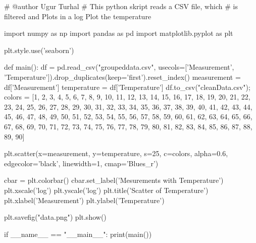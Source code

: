 \documentclass[12pt]{article}
\begin{document}
\begin{python}
# @author Ugur Turhal
# This python skript reads a CSV file, which
# is filtered and Plots in a log Plot the temperature

import numpy as np
import pandas as pd
import matplotlib.pyplot as plt

plt.style.use('seaborn')


def main():
    df = pd.read_csv("groupeddata.csv", usecols=['Measurement', 'Temperature']).drop_duplicates(keep='first').reset_index()
    measurement = df['Measurement']
    temperature = df['Temperature']
    df.to_csv("cleanData.csv");
    colors = [1, 2, 3, 4, 5, 6, 7, 8, 9, 10, 11, 12, 13, 14, 15, 16, 17, 18, 19, 20, 21, 22, 23, 24, 25, 26, 27, 28, 29, 30, 31, 32, 33, 34, 35, 36, 37, 38, 39, 40, 41, 42, 43, 44, 45, 46, 47, 48, 49, 50, 51, 52, 53, 54, 55, 56, 57, 58, 59, 60, 61, 62, 63, 64, 65, 66, 67, 68, 69, 70, 71, 72, 73, 74, 75, 76, 77, 78, 79, 80, 81, 82, 83, 84, 85, 86, 87, 88, 89, 90]

    plt.scatter(x=measurement, y=temperature, s=25, c=colors, alpha=0.6, edgecolor='black', linewidth=1,
                    cmap='Blues_r')

    cbar = plt.colorbar()
    cbar.set_label('Mesurements with Temperature')
    plt.xscale('log')
    plt.yscale('log')
    plt.title('Scatter of Temperature')
    plt.xlabel('Measurement')
    plt.ylabel('Temperature')

    plt.savefig("data.png")
    plt.show()


if __name__ == "__main__":
    print(main())

\end{python}
\end{document}
